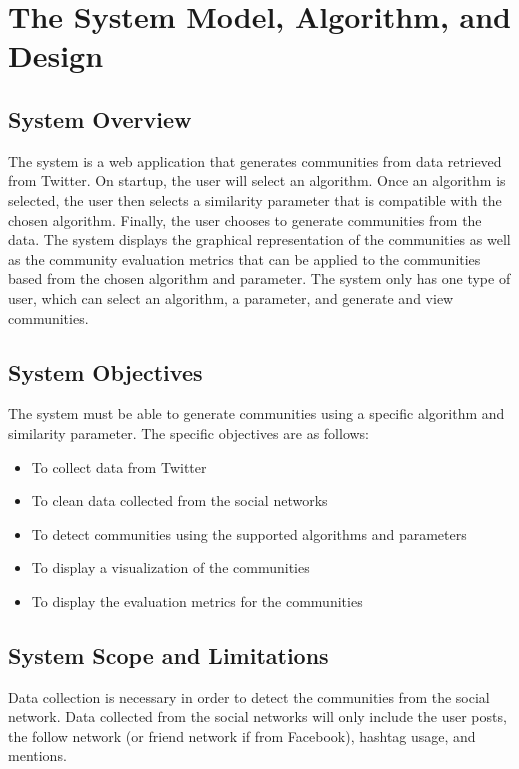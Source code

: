 %
%
%                 


\chapter{The System Model, Algorithm, and Design}
\label{sec:sysmodel}


\section{System Overview}
The system is a web application that generates communities from data retrieved from Twitter. 
On startup, the user will select an algorithm. Once an algorithm is selected, the user then selects a similarity parameter that is compatible
with the chosen algorithm. Finally, the user chooses to generate communities from the data. The system displays 
the graphical representation of the communities as well as the community evaluation metrics that can be applied 
to the communities based from the chosen algorithm and parameter. The system only has one type of user, which 
can select an algorithm, a parameter, and generate and view communities.


\section{System Objectives}
The system must be able to generate communities using a specific algorithm and similarity parameter. The specific objectives are as follows:


\begin{itemize}
	\item To collect data from Twitter
	\item To clean data collected from the social networks
	\item To detect communities using the supported algorithms and parameters
	\item To display a visualization of the communities
	\item To display the evaluation metrics for the communities
\end{itemize}


\section{System Scope and Limitations}
Data collection is necessary in order to detect the communities from the social network.
Data collected from the social networks will only include the user posts, the follow network (or friend network if from Facebook),
hashtag usage, and mentions.


